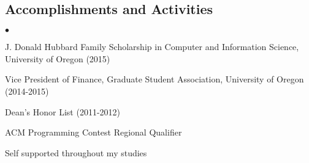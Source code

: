 \documentclass[margin,line]{res}
\newenvironment{list2}{
  \begin{list}{$\bullet$}{%
      \setlength{\itemsep}{0in}
      \setlength{\parsep}{0in} \setlength{\parskip}{0in}
      \setlength{\topsep}{0in} \setlength{\partopsep}{0in} 
      \setlength{\leftmargin}{0.2in}}}{\end{list}}
\begin{document}
\begin{resume}
\section{\sc Accomplishments and Activities}
\begin{list2}
	\item J. Donald Hubbard Family Scholarship in Computer and Information Science, University of Oregon (2015)
	\item Vice President of Finance, Graduate Student Association, University of Oregon (2014-2015)
	\item Dean's Honor List (2011-2012)
	\item ACM Programming Contest Regional Qualifier 
	\item Self supported throughout my studies  
\end{list2}

\end{resume}
\end{document}
